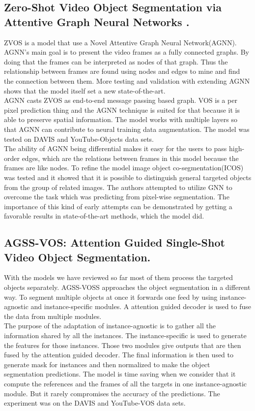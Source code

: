 \documentclass[conference]{IEEEtran}
\begin{document}
\subsection{Zero-Shot Video Object Segmentation via Attentive Graph Neural Networks
.} ZVOS\cite{wang2019zero} is a model that use a Novel Attentive Graph Neural Network(AGNN). AGNN's main goal is to present the video frames as a fully connected graphs. By doing that the frames can be interpreted as nodes of that graph. Thus the relationship between frames are found using nodes and edges to mine and find the connection between them. More testing and validation with extending AGNN shows that the model itself set a new state-of-the-art. \\
AGNN casts ZVOS as end-to-end message passing based graph. VOS is a per pixel prediction thing and the AGNN technique is suited for that because it is able to preserve spatial information. The model works with multiple layers so that AGNN can contribute to neural training data augmentation. The model was tested on DAVIS\cite{binas2017ddd17}  and YouTube-Objects\cite{xu2018youtube} data sets.\\
The ability of AGNN being differential makes it easy for the users to pass high-order edges, which are the relations between frames in this model because the frames are like nodes. To refine the model image object co-segmentation(ICOS) was tested and it showed that it is possible to distinguish general targeted objects from the group of related images. The authors attempted to utilize GNN to overcome the task which was predicting from pixel-wise segmentation. The importance of this kind of early attempts can be demonstrated by getting a favorable results in state-of-the-art methods, which the model did.  


\subsection{AGSS-VOS: Attention Guided Single-Shot Video Object Segmentation.} With the models we have reviewed so far most of them process the targeted objects separately. AGSS-VOSS\cite{Lin_2019_ICCV} approaches the object segmentation in a different way. To segment multiple objects at once it forwards one feed by using instance-agnostic and instance-specific modules. A attention guided decoder is used to fuse the data from multiple modules.\\
The purpose of the adaptation of instance-agnostic is to gather all the information shared by all the instances. The instance-specific is used to generate the features for those instances. Those two modules give outputs that are then fused by the attention guided decoder. The final information is then used to generate mask for instances and then normalized to make the object segmentation predictions.
The model is time saving when we consider that it compute the references and the frames of all the targets in one instance-agnostic module. But it rarely compromises the accuracy of the predictions. The experiment was on the DAVIS\cite{binas2017ddd17} and YouTube-VOS\cite{xu2018youtube} data sets.
\end{document}
